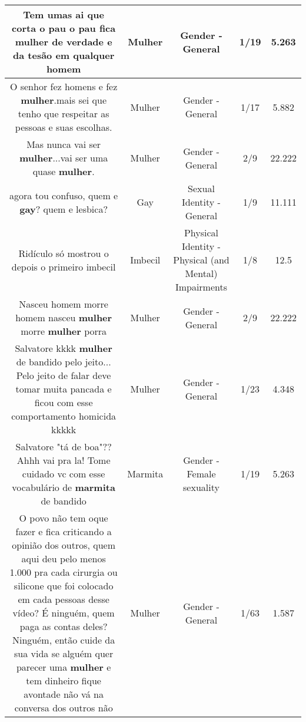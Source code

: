 \documentclass[11pt]{article}
\newlength\mylength
\begin{document}
\begin{center}
\begin{longtable}{|C{.65\mylength}|C{.30\mylength}|C{.12\mylength}|C{.12\mylength}|C{.12\mylength}|}
  \small Tem umas ai que corta o pau o pau fica \textbf{mulher} de verdade e da tesão em qualquer  homem\normalsize   & Mulher & Gender - General & 1/19 & 5.263 \\  \hline
  \small O senhor fez homens e fez \textbf{mulher}.mais sei que tenho que respeitar as pessoas e suas escolhas.\normalsize   & Mulher & Gender - General & 1/17 & 5.882 \\  \hline
  \small Mas nunca vai ser \textbf{mulher}...vai ser uma quase \textbf{mulher}.\normalsize   & Mulher & Gender - General & 2/9 & 22.222 \\  \hline
  \small agora tou confuso, quem e \textbf{gay}? quem e lesbica?\normalsize   & Gay & Sexual Identity - General & 1/9 & 11.111 \\  \hline
  \small Ridículo só mostrou o depois o primeiro imbecil\normalsize   & Imbecil & Physical Identity - Physical (and Mental) Impairments & 1/8 & 12.5 \\  \hline
  \small Nasceu homem morre homem nasceu \textbf{mulher} morre \textbf{mulher} porra\normalsize   & Mulher & Gender - General & 2/9 & 22.222 \\  \hline
  \small {} Salvatore kkkk \textbf{mulher} de bandido pelo jeito... Pelo jeito de falar deve tomar muita pancada e ficou com esse comportamento homicida kkkkk\normalsize   & Mulher & Gender - General & 1/23 & 4.348 \\  \hline
  \small {} Salvatore "tá de boa"?? Ahhh vai pra la! Tome cuidado vc com esse vocabulário de \textbf{marmita} de bandido\normalsize   & Marmita & Gender - Female sexuality & 1/19 & 5.263 \\  \hline
  \small O povo não tem oque fazer e fica criticando a opinião dos outros, quem aqui deu pelo menos 1.000 pra cada cirurgia ou silicone que foi colocado em cada pessoas desse vídeo? É ninguém, quem paga as contas deles? Ninguém, então cuide da sua vida se alguém quer parecer uma \textbf{mulher} e tem dinheiro fique avontade não vá na conversa dos outros não\normalsize   & Mulher & Gender - General & 1/63 & 1.587 \\  \hline

\end{longtable}
\end{center}
\end{document}
